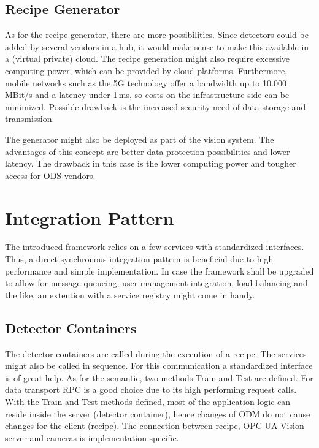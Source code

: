 \subsection{Recipe Generator}
As for the recipe generator, there are more possibilities. Since detectors could be added by several vendors in a hub, it would make sense to make this available in a (virtual private) cloud. The recipe generation might also require excessive computing power, which can be provided by cloud platforms. Furthermore, mobile networks such as the 5G technology offer a bandwidth up to 10.000\,MBit/s and a latency under 1\,ms, so costs on the infrastructure side can be minimized. Possible drawback is the increased security need of data storage and transmission.

The generator might also be deployed as part of the vision system. The advantages of this concept are better data protection possibilities and lower latency. The drawback in this case is the lower computing power and tougher access for ODS vendors.

\section{Integration Pattern}
The introduced framework relies on a few services with standardized interfaces. Thus, a direct synchronous integration pattern is beneficial due to high performance and simple implementation. In case the framework shall be upgraded to allow for message queueing, user management integration, load balancing and the like, an extention with a service registry might come in handy.

\subsection{Detector Containers}
The detector containers are called during the execution of a recipe. The services might also be called in sequence. For this communication a standardized interface is of great help. As for the semantic, two methods Train and Test are defined. For data transport RPC is a good choice due to its high performing request calls. With the Train and Test methods defined, most of the application logic can reside inside the server (detector container), hence changes of ODM do not cause changes for the client (recipe). The connection between recipe, OPC UA Vision server and cameras is implementation specific.

